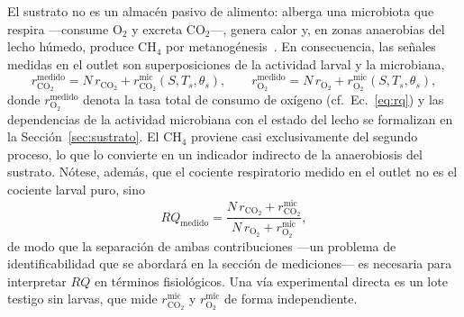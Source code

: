 \begin{remark}
\label{rem:microbiano}
El sustrato no es un almac\'en pasivo de alimento: alberga una microbiota que respira ---consume O$_2$ y excreta CO$_2$---, genera calor y, en zonas anaerobias del lecho h\'umedo, produce CH$_4$ por metanog\'enesis~\citep{ermolaevGreenhouseGasEmissions2019,parodiBioconversionEfficienciesGreenhouse2020a}. En consecuencia, las se\~nales medidas en el outlet son superposiciones de la actividad larval y la microbiana,
\begin{equation}
r^{\mathrm{medido}}_{\mathrm{CO_2}} = N\,r_{\mathrm{CO_2}} + r^{\mathrm{mic}}_{\mathrm{CO_2}}(S, T_s, \theta_s),
\qquad
r^{\mathrm{medido}}_{\mathrm{O_2}} = N\,r_{\mathrm{O_2}} + r^{\mathrm{mic}}_{\mathrm{O_2}}(S, T_s, \theta_s),
\label{eq:co2-superpuesto}
\end{equation}
donde $r^{\mathrm{medido}}_{\mathrm{O_2}}$ denota la tasa total de consumo de ox\'igeno (cf.~Ec.~\eqref{eq:rq}) y las dependencias de la actividad microbiana con el estado del lecho se formalizan en la Secci\'on~\ref{sec:sustrato}. El CH$_4$ proviene casi exclusivamente del segundo proceso, lo que lo convierte en un indicador indirecto de la anaerobiosis del sustrato. N\'otese, adem\'as, que el cociente respiratorio medido en el outlet no es el cociente larval puro, sino
\begin{equation}
RQ_{\mathrm{medido}} = \frac{N\,r_{\mathrm{CO_2}} + r^{\mathrm{mic}}_{\mathrm{CO_2}}}{N\,r_{\mathrm{O_2}} + r^{\mathrm{mic}}_{\mathrm{O_2}}},
\label{eq:rq-medido}
\end{equation}
de modo que la separaci\'on de ambas contribuciones ---un problema de identificabilidad que se abordar\'a en la secci\'on de mediciones--- es necesaria para interpretar $RQ$ en t\'erminos fisiol\'ogicos. Una v\'ia experimental directa es un lote testigo sin larvas, que mide $r^{\mathrm{mic}}_{\mathrm{CO_2}}$ y $r^{\mathrm{mic}}_{\mathrm{O_2}}$ de forma independiente.
\end{remark}

